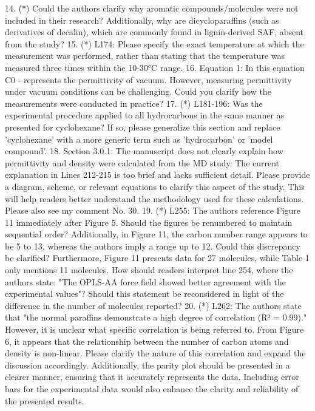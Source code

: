 \documentclass{article}
\begin{document}
14.     (*) Could the authors clarify why aromatic compounds/molecules were not included in their research? Additionally, why are dicycloparaffins (such as derivatives of decalin), which are commonly found in lignin-derived SAF, absent from the study?
15.     (*) L174: Please specify the exact temperature at which the measurement was performed, rather than stating that the temperature was measured three times within the 10-30°C range.
16.     Equation 1: In this equation C0 - represents the permittivity of vacuum. However, measuring permittivity under vacuum conditions can be challenging. Could you clarify how the measurements were conducted in practice?
17.     (*) L181-196: Was the experimental procedure applied to all hydrocarbons in the same manner as presented for cyclohexane? If so, please generalize this section and replace 'cyclohexane' with a more generic term such as 'hydrocarbon' or 'model compound'.
18.     Section 3.0.1: The manuscript does not clearly explain how permittivity and density were calculated from the MD study. The current explanation in Lines 212-215 is too brief and lacks sufficient detail. Please provide a diagram, scheme, or relevant equations to clarify this aspect of the study. This will help readers better understand the methodology used for these calculations. Please also see my comment No. 30.
19.     (*) L255: The authors reference Figure 11 immediately after Figure 5. Should the figures be renumbered to maintain sequential order? Additionally, in Figure 11, the carbon number range appears to be 5 to 13, whereas the authors imply a range up to 12. Could this discrepancy be clarified?  Furthermore, Figure 11 presents data for 27 molecules, while Table 1 only mentions 11 molecules. How should readers interpret line 254, where the authors state: "The OPLS-AA force field showed better agreement with the experimental values"? Should this statement be reconsidered in light of the difference in the number of molecules reported?
20.     (*) L262: The authors state that "the normal paraffins demonstrate a high degree of correlation (R² = 0.99)." However, it is unclear what specific correlation is being referred to. From Figure 6, it appears that the relationship between the number of carbon atoms and density is non-linear. Please clarify the nature of this correlation and expand the discussion accordingly. Additionally, the parity plot should be presented in a clearer manner, ensuring that it accurately represents the data. Including error bars for the experimental data would also enhance the clarity and reliability of the presented results.
\end{document}
